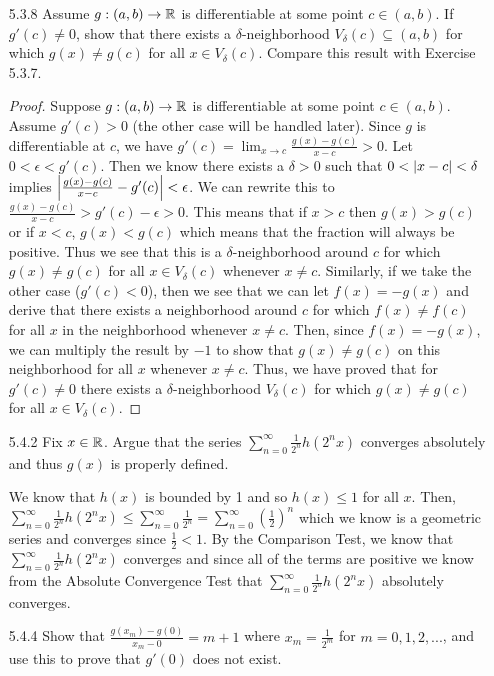 \documentclass[12pt,letterpaper]{article}
\begin{document}
\begin{itemize}[leftmargin=!,labelindent=5pt]
        \item [5.3.8] Assume $g:(a,b) \to \mathbb{R}$ is differentiable at some point $c \in (a,b)$. If $g'(c) \neq 0$, show that there exists a $\delta$-neighborhood $V_\delta(c) \subseteq (a,b)$ for which $g(x) \neq g(c)$ for all $x \in V_\delta(c)$. Compare this result with Exercise 5.3.7.
            \begin{proof}
                Suppose $g:(a,b) \to \mathbb{R}$ is differentiable at some point $c \in (a,b)$.
                Assume $g'(c) > 0$ (the other case will be handled later).
                Since $g$ is differentiable at $c$, we have $g'(c) = \lim_{x \to c} \frac{g(x) - g(c)}{x - c} > 0$.
                Let $0 < \epsilon < g'(c)$.
                Then we know there exists a $\delta > 0$ such that $0 < \abs{x-c} < \delta$ implies $\abs{\frac{g(x) - g(c)}{x-c} - g'(c)} < \epsilon$.
                We can rewrite this to $\frac{g(x) - g(c)}{x-c} > g'(c) - \epsilon > 0$.
                This means that if $x > c$ then $g(x) > g(c)$ or if $x < c$, $g(x) < g(c)$ which means that the fraction will always be positive.
                Thus we see that this is a $\delta$-neighborhood around $c$ for which $g(x) \neq g(c)$ for all $x \in V_\delta(c)$ whenever $x\neq c$.
                Similarly, if we take the other case ($g'(c) < 0$), then we see that we can let $f(x) = -g(x)$ and derive that there exists a neighborhood around $c$ for which $f(x) \neq f(c)$ for all $x$ in the neighborhood whenever $x \neq c$.
                Then, since $f(x) = -g(x)$, we can multiply the result by $-1$ to show that $g(x) \neq g(c)$ on this neighborhood for all $x$ whenever $x \neq c$.
                Thus, we have proved that for $g'(c) \neq 0$ there exists a $\delta$-neighborhood $V_\delta(c)$ for which $g(x) \neq g(c)$ for all $x \in V_\delta(c)$.
            \end{proof}
        \item [5.4.2] Fix $x \in \mathbb{R}$. Argue that the series $\sum_{n=0}^{\infty} \frac{1}{2^n}h(2^n x)$ converges absolutely and thus $g(x)$ is properly defined.
        
            We know that $h(x)$ is bounded by 1 and so $h(x) \leq 1$ for all $x$.
            Then, $\sum_{n=0}^{\infty} \frac{1}{2^n}h(2^n x) \leq \sum_{n=0}^{\infty} \frac{1}{2^n} = \sum_{n=0}^{\infty} (\frac{1}{2})^n$ which we know is a geometric series and converges since $\frac{1}{2} < 1$.
            By the Comparison Test, we know that $\sum_{n=0}^{\infty} \frac{1}{2^n}h(2^n x)$ converges and since all of the terms are positive we know from the Absolute Convergence Test that $\sum_{n=0}^{\infty} \frac{1}{2^n}h(2^n x)$ absolutely converges.
        \newpage
        \item [5.4.4] Show that $\frac{g(x_m) - g(0)}{x_m - 0} = m+1$ where $x_m = \frac{1}{2^m}$ for $m = 0,1,2,...$, and use this to prove that $g'(0)$ does not exist.
            

\end{itemize}
\end{document}
